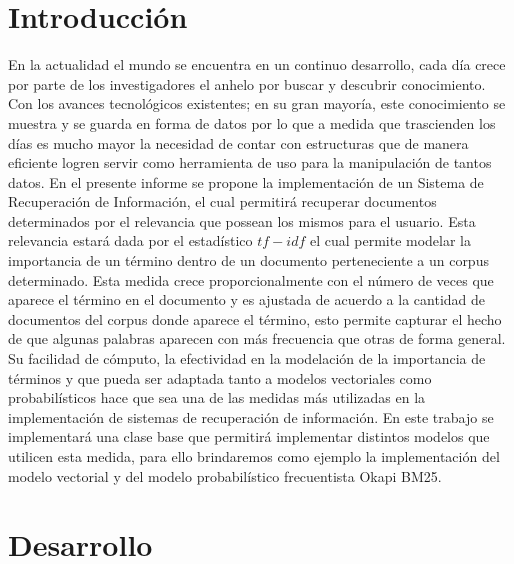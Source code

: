 \documentclass[a4paper,10pt,twocolumn]{article}
\begin{document}
\section{Introducción}\label{sec:intro}
En la actualidad el mundo se encuentra en un continuo desarrollo, cada día crece por parte 
de los investigadores el anhelo por buscar y descubrir conocimiento. Con los avances tecnológicos existentes; 
en su gran mayoría, este conocimiento se muestra y se guarda en forma de datos por lo que a medida que trascienden 
los días es mucho mayor la necesidad de contar con estructuras que de manera eficiente logren servir como herramienta
de uso para la manipulación de tantos datos. En el presente informe se propone la implementación 
de un Sistema de Recuperación de Información, el cual permitirá recuperar documentos determinados por el relevancia que
possean los mismos para el usuario. Esta relevancia estará dada por el estad\'istico $tf-idf$ el cual permite modelar la 
importancia de un t\'ermino dentro de un documento perteneciente a un corpus determinado. Esta medida crece 
proporcionalmente con el n\'umero de veces que aparece el t\'ermino en el documento y es
ajustada de acuerdo a la cantidad de documentos del corpus donde aparece el t\'ermino, esto
permite capturar el hecho de que algunas palabras aparecen con m\'as frecuencia que otras 
de forma general. Su facilidad de c\'omputo, la efectividad en la modelaci\'on de la importancia de 
t\'erminos y que pueda ser adaptada tanto a modelos vectoriales como probabil\'isticos 
hace que sea una de las medidas m\'as utilizadas en la implementaci\'on de sistemas
de recuperaci\'on de informaci\'on. En este trabajo se implementar\'a una clase base que 
permitir\'a implementar distintos modelos que utilicen esta medida, para ello brindaremos
como ejemplo la implementaci\'on del modelo vectorial y del modelo probabil\'istico frecuentista 
Okapi BM25. 



\section{Desarrollo}\label{sec:dev}
\end{document}
